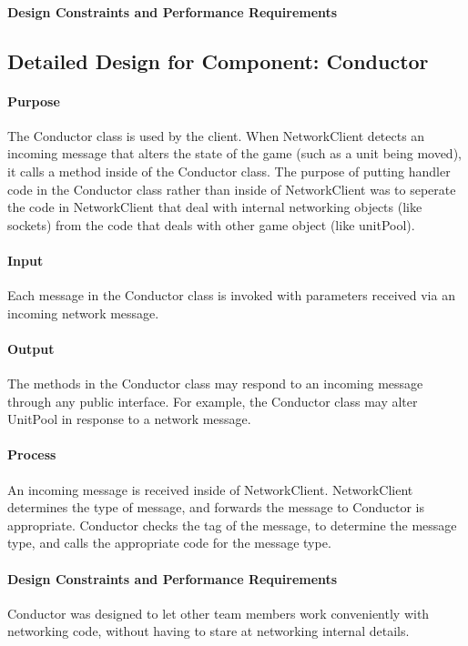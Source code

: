 \documentclass[12pt,a4paper,titlepage]{article}
\begin{document}
\paragraph{Design Constraints and Performance Requirements}

\subsection{Detailed Design for Component: Conductor}
\paragraph{Purpose} The Conductor class is used by the client. When NetworkClient detects an incoming message that alters the state of the game (such as a unit being moved), it calls a method inside of the Conductor class. The purpose of putting handler code in the Conductor class rather than inside of NetworkClient was to seperate the code in NetworkClient that deal with internal networking objects (like sockets) from the code that deals with other game object (like unitPool).
\paragraph{Input} Each message in the Conductor class is invoked with parameters received via an incoming network message.
\paragraph{Output} The methods in the Conductor class may respond to an incoming message through any public interface. For example, the Conductor class may alter UnitPool in response to a network message.
\paragraph{Process} An incoming message is received inside of NetworkClient. NetworkClient determines the type of message, and forwards the message to Conductor is appropriate. Conductor checks the tag of the message, to determine the message type, and calls the appropriate code for the message type.
\paragraph{Design Constraints and Performance Requirements} Conductor was designed to let other team members work conveniently with networking code, without having to stare at networking internal details.
\end{document}
